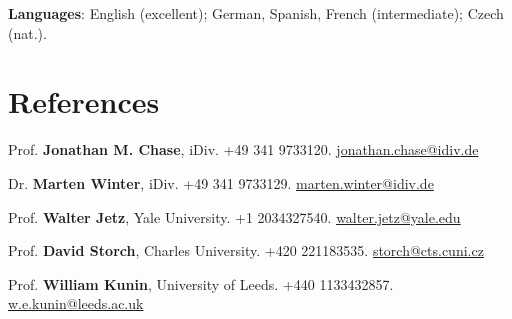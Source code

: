 \medskip

{\bf Languages}: English (excellent); German, Spanish, French (intermediate); Czech (nat.).

\HRule

\section{References}


Prof. \textbf{Jonathan M. Chase}, iDiv. \phone +49 341 9733120. \href{mailto: jonathan.chase@idiv.de}{jonathan.chase@idiv.de}

\medskip

Dr. \textbf{Marten Winter}, iDiv. \phone +49 341 9733129. \href{mailto: marten.winter@idiv.de}{marten.winter@idiv.de}

\medskip

Prof. \textbf{Walter Jetz}, Yale University. \phone +1 2034327540. \href{mailto:walter.jetz@yale.edu}{walter.jetz@yale.edu}

\medskip

Prof. \textbf{David Storch}, Charles University. \phone +420 221183535. 
\href{mailto:storch@cts.cuni.cz}{storch@cts.cuni.cz}

\medskip

Prof. \textbf{William Kunin}, University of Leeds. \phone +440 1133432857. \href{mailto:w.e.kunin@leeds.ac.uk}{w.e.kunin@leeds.ac.uk}






\grid
\grid
